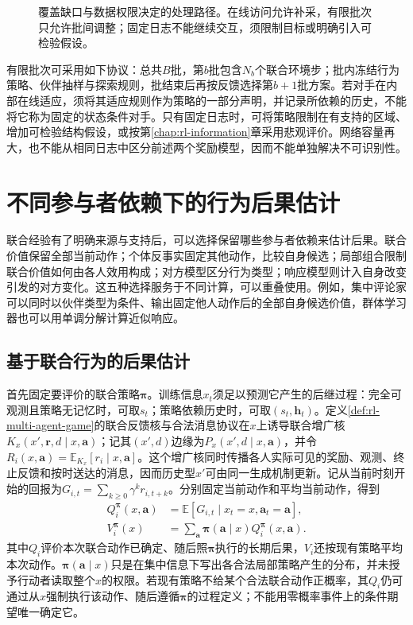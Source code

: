 \begin{figure}[htbp]
 \centering
 
 \caption{覆盖缺口与数据权限决定的处理路径。在线访问允许补采，有限批次只允许批间调整；固定日志不能继续交互，须限制目标或明确引入可检验假设。}
 \label{fig:rl-multi-agent-data-loop}
\end{figure}

有限批次可采用如下协议：总共$B$批，第$b$批包含$N_b$个联合环境步；批内冻结行为策略、伙伴抽样与探索规则，批结束后再按反馈选择第$b+1$批方案。若对手在内部在线适应，须将其适应规则作为策略的一部分声明，并记录所依赖的历史，不能将它称为固定的状态条件对手。只有固定日志时，可将策略限制在有支持的区域、增加可检验结构假设，或按第\ref{chap:rl-information}章采用悲观评价。网络容量再大，也不能从相同日志中区分前述两个奖励模型，因而不能单独解决不可识别性。

\section{不同参与者依赖下的行为后果估计}
\label{sec:rl-multi-agent-estimation}

联合经验有了明确来源与支持后，可以选择保留哪些参与者依赖来估计后果。联合价值保留全部当前动作；个体反事实固定其他动作，比较自身候选；局部组合限制联合价值如何由各人效用构成；对方模型区分行为类型；响应模型则计入自身改变引发的对方变化。这五种选择服务于不同计算，可以重叠使用。例如，集中评论家可以同时以伙伴类型为条件、输出固定他人动作后的全部自身候选价值，群体学习器也可以用单调分解计算近似响应。

\subsection{基于联合行为的后果估计}
\label{sec:rl-multi-agent-joint-value}

首先固定要评价的联合策略$\bm\pi$。训练信息$x_t$须足以预测它产生的后继过程：完全可观测且策略无记忆时，可取$s_t$；策略依赖历史时，可取$(s_t,\bm h_t)$。定义\ref{def:rl-multi-agent-game}的联合反馈核与合法消息协议在$x$上诱导联合增广核$K_x(x',\bm r,d\mid x,\bm a)$；记其$(x',d)$边缘为$P_x(x',d\mid x,\bm a)$，并令$R_i(x,\bm a)=\mathbb E_{K_x}[r_i\mid x,\bm a]$。这个增广核同时传播各人实际可见的奖励、观测、终止反馈和按时送达的消息，因而历史型$x'$可由同一生成机制更新。记从当前时刻开始的回报为$G_{i,t}=\sum_{k\geq0}\gamma^k r_{i,t+k}$。分别固定当前动作和平均当前动作，得到
\begin{align}
 Q_i^{\bm\pi}(x,\bm a)
 &=\mathbb E[G_{i,t}\mid x_t=x,\bm a_t=\bm a],\\
 V_i^{\bm\pi}(x)
 &=\sum_{\bm a}\bm\pi(\bm a\mid x)Q_i^{\bm\pi}(x,\bm a).
\end{align}
其中$Q_i$评价本次联合动作已确定、随后照$\bm\pi$执行的长期后果，$V_i$还按现有策略平均本次动作。$\bm\pi(\bm a\mid x)$只是在集中信息下写出各合法局部策略产生的分布，并未授予行动者读取整个$x$的权限。若现有策略不给某个合法联合动作正概率，其$Q_i$仍可通过从$x$强制执行该动作、随后遵循$\bm\pi$的过程定义；不能用零概率事件上的条件期望唯一确定它。

